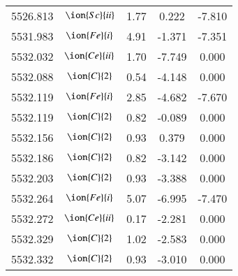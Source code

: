 \documentclass[fleqn,usenatbib]{mnras}
\begin{document}
\begin{center}
\begin{table}
\begin{tabular}{ccccc}
5526.813 &  $\ion{Sc}{ii}$  & 1.77 & 0.222 & -7.810 \\ 
5531.983 &  $\ion{Fe}{i}$  & 4.91 & -1.371 & -7.351 \\ 
5532.032 &  $\ion{Ce}{ii}$  & 1.70 & -7.749 & 0.000 \\ 
5532.088 &  $\ion{C}{2}$ & 0.54 & -4.148 & 0.000 \\ 
5532.119 &  $\ion{Fe}{i}$  & 2.85 & -4.682 & -7.670 \\ 
5532.119 &  $\ion{C}{2}$ & 0.82 & -0.089 & 0.000 \\ 
5532.156 &  $\ion{C}{2}$ & 0.93 & 0.379 & 0.000 \\ 
5532.186 &  $\ion{C}{2}$ & 0.82 & -3.142 & 0.000 \\ 
5532.203 &  $\ion{C}{2}$ & 0.93 & -3.388 & 0.000 \\ 
5532.264 &  $\ion{Fe}{i}$  & 5.07 & -6.995 & -7.470 \\ 
5532.272 &  $\ion{Ce}{ii}$  & 0.17 & -2.281 & 0.000 \\ 
5532.329 &  $\ion{C}{2}$ & 1.02 & -2.583 & 0.000 \\ 
5532.332 &  $\ion{C}{2}$ & 0.93 & -3.010 & 0.000 \\
 \end{tabular}
 \end{table}
 \end{center}
\end{document}
